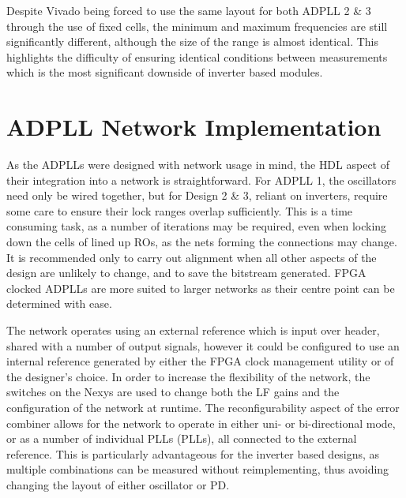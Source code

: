 Despite Vivado being forced to use the same layout for both \ac{ADPLL} 2 \& 3 through the use of fixed cells, the minimum and maximum frequencies are still significantly different, although the size of the range is almost identical. This highlights the difficulty of ensuring identical conditions between measurements which is the most significant downside of inverter based modules. 


\section{\acs{ADPLL} Network Implementation}
As the \acp{ADPLL} were designed with network usage in mind, the \ac{HDL} aspect of their integration into a network is straightforward. For \ac{ADPLL} 1, the oscillators need only be wired together, but for Design 2 \& 3, reliant on inverters, require some care to ensure their lock ranges overlap sufficiently. This is a time consuming task, as a number of iterations may be required, even when locking down the cells of lined up \acp{RO}, as the nets forming the connections may change. It is recommended only to carry out alignment when all other aspects of the design are unlikely to change, and to save the bitstream generated. \ac{FPGA} clocked \acp{ADPLL} are more suited to larger networks as their centre point can be determined with ease.

The network operates using an external reference which is input over  header, shared with a number of output signals, however it could be configured to use an internal reference generated by either the \ac{FPGA} clock management utility or  of the designer's choice. In order to increase the flexibility of the network, the switches on the \acs*{Nexys} are used to change both the \ac{LF} gains and the configuration of the network at runtime. The reconfigurability aspect of the error combiner allows for the network to operate in either uni- or bi-directional mode, or as a number of individual \aclp{PLL} (\acsp{PLL}), all connected to the external reference. This is particularly advantageous for the inverter based designs, as multiple combinations can be measured without reimplementing, thus avoiding changing the layout of either oscillator or \acl{PD}.


